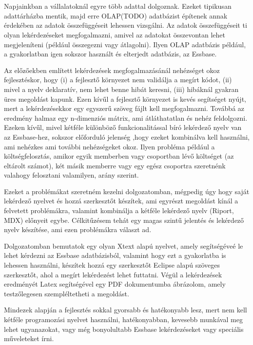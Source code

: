 \chapter*{\bevezeto}
Napjainkban a vállalatoknál egyre több adattal dolgoznak. Ezeket
tipikusan adattárházba mentik, majd erre OLAP(TODO) adatbázist építenek annak
érdekében az adatok összefüggéseit lehessen vizsgálni. Az adatok összefüggéseit
ti olyan lekérdezéseket megfogalmazni, amivel az adatokat
összevontan lehet megjeleníteni (például összegezni vagy átlagolni).
Ilyen OLAP adatbázis például, a gyakorlatban igen sokszor használt és elterjedt
adatbázis, az Essbase.

Az előzőekben említett lekérdezések megfogalmazásánál 
nehézséget okoz fejlesztéskor, hogy (i) a fejlesztő környezet nem validálja a megírt kódot, (ii) mivel a nyelv deklaratív, nem lehet benne hibát keresni, (iii) hibáknál gyakran üres megoldást kapunk. Ezen kívűl a fejlesztő környezet is kevés segítséget nyújt, mert a lekérdezésekkor egy egyszerű szöveg fájlt kell megfogalmazni.
Továbbá az eredmény halmaz egy n-dimenziós mátrix, ami átláthatatlan és nehéz feldolgozni. Ezeken
kívűl, mivel kétféle különböző funkcionalitással bíró lekérdező nyelv van az Essbase-hez, sokszor előforduló jelenség 
,hogy ezeket kombinálva kell használni, ami nehézkes ami további nehézségeket okoz. Ilyen probléma
például a költségfelosztás, amikor egyik memberben vagy csoportban lévő
költséget (az eltárolt számot), két másik memberre vagy egy egész csoportra
szeretnénk valahogy felosztani valamilyen, arány szerint.

Ezeket a problémákat szeretném kezelni dolgozatomban, mégpedig úgy hogy saját lekérdező nyelvet és hozzá szerkesztőt készítek, ami egyrészt megoldást kínál a felvetett problémákra, valamint kombinálja a kétféle lekérdező
nyelv (Riport, MDX) előnyeit egybe. Célkitűzésem tehát egy magas szintű jelentés
és lekérdező nyelv készítése, ami ezen problémákra választ ad.

Dolgozatomban bemutatok egy olyan Xtext alapú nyelvet, amely segítségéveé le lehet kérdezni az
Essbase adatbázisból, valamint hogy ezt a gyakorlatba is lehessen használni,
készítek hozzá egy szerkesztőt Eclipse alapú szöveges szerkesztőt, ahol a megírt lekérdezést
lehet futtatni. Végül a lekérdezések eredményét Latex segítségével egy PDF dokumentumba ábrázolom, amely testzőlegesen szempléltetheti a megoldást.

Mindezek alapján a fejlesztés sokkal gyorsabb és hatékonyabb lesz, mert nem kell
kétféle programozási nyelvet használni, hatékonyabban, kevesebb munkával meg
lehet ugyanazokat, vagy még bonyolultabb Essbase lekérdezéseket vagy speciális
műveleteket írni.


 
